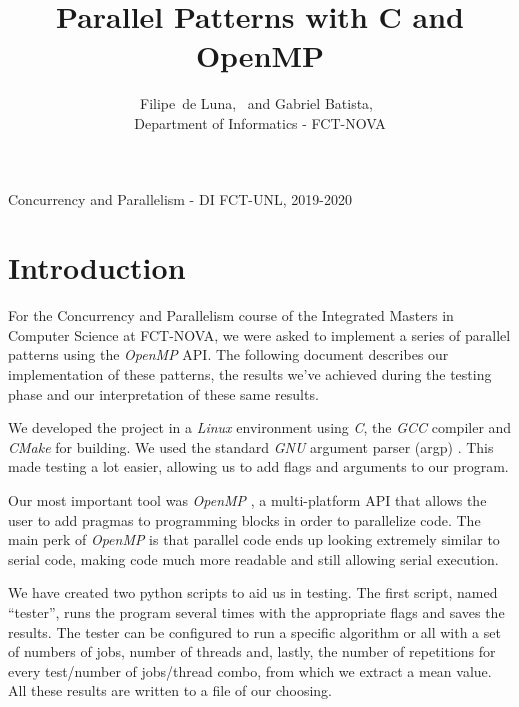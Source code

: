 \documentclass[10pt,journal]{IEEEtran}
\begin{document}

\title{Parallel Patterns with C and OpenMP}


\author{
	{
		Filipe~de Luna,~ and
        Gabriel Batista,~
    } \\ Department of Informatics - FCT-NOVA
        
}

%
{Concurrency and Parallelism - DI FCT-UNL, 2019-2020}

\maketitle

\section{Introduction}
For the Concurrency and Parallelism course of the Integrated Masters in Computer Science at FCT-NOVA, we were asked to implement a series of parallel patterns using the \textit{OpenMP} API. The following document describes our implementation of these patterns, the results we’ve achieved during the testing phase and our interpretation of these same results.

We developed the project in a \textit{Linux} environment using \textit{C}, the \textit{GCC} compiler and \textit{CMake} for building. We used the standard \textit{GNU} argument parser (argp) \cite{argp}. This made testing a lot easier, allowing us to add flags and arguments to our program.

Our most important tool was \textit{OpenMP} \cite{omp}, a multi-platform API that allows the user to add pragmas to programming blocks in order to parallelize code. The main perk of \textit{OpenMP} is that parallel code ends up looking extremely similar to serial code, making code much more readable and still allowing serial execution.

We have created two python scripts to aid us in testing. The first script, named “tester”, runs the program several times with the appropriate flags and saves the results. The tester can be configured to run a specific algorithm or all with a set of numbers of jobs, number of threads and, lastly, the number of repetitions for every test/number of jobs/thread combo, from which we extract a mean value. All these results are written to a file of our choosing.
\end{document}

